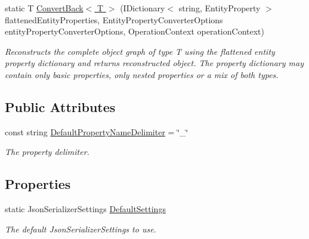 \begin{DoxyCompactItemize}
static T \hyperlink{classMicrosoft_1_1WindowsAzure_1_1Storage_1_1Table_1_1EntityPropertyConverter_a3beb7c8638a8f6a84bd16c0f0a00521d_a3beb7c8638a8f6a84bd16c0f0a00521d}{Convert\+Back$<$ T $>$} (I\+Dictionary$<$ string, Entity\+Property $>$ flattened\+Entity\+Properties, Entity\+Property\+Converter\+Options entity\+Property\+Converter\+Options, Operation\+Context operation\+Context)
\begin{DoxyCompactList}\small\item\em Reconstructs the complete object graph of type T using the flattened entity property dictionary and returns reconstructed object. The property dictionary may contain only basic properties, only nested properties or a mix of both types. \end{DoxyCompactList}\end{DoxyCompactItemize}
\subsection*{Public Attributes}
\begin{DoxyCompactItemize}
\item 
const string \hyperlink{classMicrosoft_1_1WindowsAzure_1_1Storage_1_1Table_1_1EntityPropertyConverter_a033985dcd943dd26b2dcb25c93a58193_a033985dcd943dd26b2dcb25c93a58193}{Default\+Property\+Name\+Delimiter} = \char`\"{}\+\_\+\char`\"{}
\begin{DoxyCompactList}\small\item\em The property delimiter. \end{DoxyCompactList}\end{DoxyCompactItemize}
\subsection*{Properties}
\begin{DoxyCompactItemize}
\item 
static Json\+Serializer\+Settings \hyperlink{classMicrosoft_1_1WindowsAzure_1_1Storage_1_1Table_1_1EntityPropertyConverter_ae422716e2356233ae6dda2bd9e73f250_ae422716e2356233ae6dda2bd9e73f250}{Default\+Settings}
\begin{DoxyCompactList}\small\item\em The default Json\+Serializer\+Settings to use. \end{DoxyCompactList}\end{DoxyCompactItemize}


